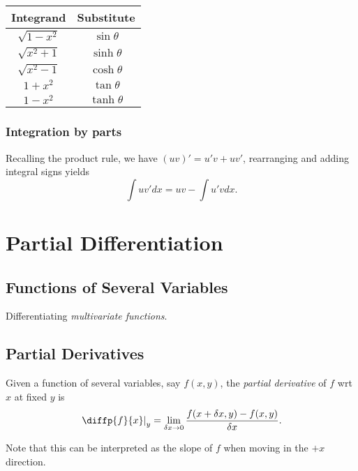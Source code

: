 \documentclass[12pt]{article}
\begin{document}
\begin{table}[h]
    \centering
    \begin{tabular}{c|c}
        Integrand & Substitute \\
        \hline
        $\sqrt{1 - x^{2}}$ & $\sin\theta $ \\
        $\sqrt{x^{2} + 1}$ & $\sinh\theta $ \\
        $\sqrt{x^{2} - 1}$ & $\cosh\theta $ \\
        $1 + x^{2}$ & $\tan\theta $ \\
        $1 - x^{2}$ & $\tanh\theta $ \\
    \end{tabular}
\end{table}

\subsubsection*{Integration by parts}

Recalling the product rule, we have $(uv)'=u'v + uv'$, 
rearranging and adding integral signs yields
\[
\int uv'dx = uv - \int u'v dx.
\]
\section{Partial Differentiation}
\subsection{Functions of Several Variables}

Differentiating \emph{multivariate functions}.


\subsection{Partial Derivatives}

\begin{definition}
    Given a function of several variables, say $f(x,y)$,
    the \emph{partial derivative} of $f$ wrt $x$ at fixed $y$ is
    \[
        \left.\diffp{f}{x}\right|_{y} 
            = \lim_{\delta x \to 0} \frac{f(x+\delta x,y) - f(x,y)}{\delta x}.
    \]
\end{definition}
Note that this can be interpreted as
the slope of $f$ when moving in the $+x$ direction.
\end{document}
